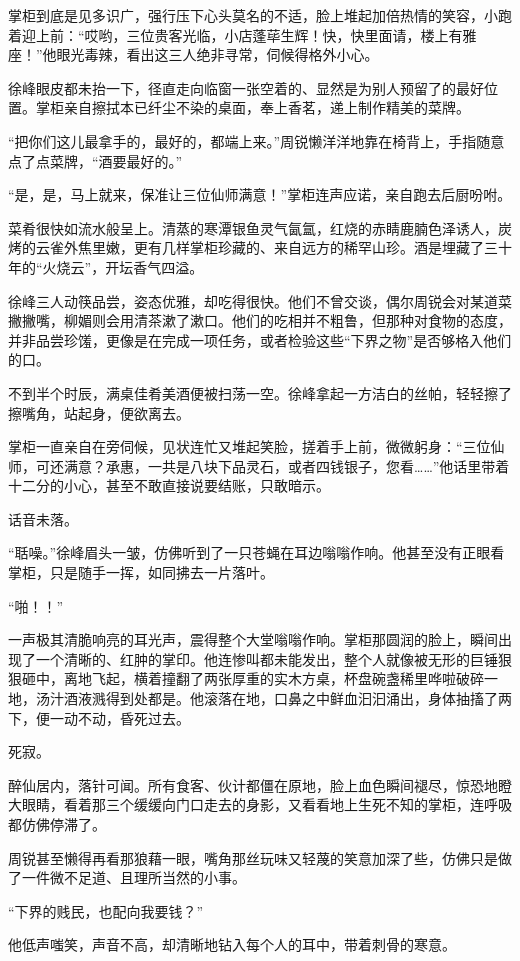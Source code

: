 掌柜到底是见多识广，强行压下心头莫名的不适，脸上堆起加倍热情的笑容，小跑着迎上前：“哎哟，三位贵客光临，小店蓬荜生辉！快，快里面请，楼上有雅座！”他眼光毒辣，看出这三人绝非寻常，伺候得格外小心。

徐峰眼皮都未抬一下，径直走向临窗一张空着的、显然是为别人预留了的最好位置。掌柜亲自擦拭本已纤尘不染的桌面，奉上香茗，递上制作精美的菜牌。

“把你们这儿最拿手的，最好的，都端上来。”周锐懒洋洋地靠在椅背上，手指随意点了点菜牌，“酒要最好的。”

“是，是，马上就来，保准让三位仙师满意！”掌柜连声应诺，亲自跑去后厨吩咐。

菜肴很快如流水般呈上。清蒸的寒潭银鱼灵气氤氲，红烧的赤睛鹿腩色泽诱人，炭烤的云雀外焦里嫩，更有几样掌柜珍藏的、来自远方的稀罕山珍。酒是埋藏了三十年的“火烧云”，开坛香气四溢。

徐峰三人动筷品尝，姿态优雅，却吃得很快。他们不曾交谈，偶尔周锐会对某道菜撇撇嘴，柳媚则会用清茶漱了漱口。他们的吃相并不粗鲁，但那种对食物的态度，并非品尝珍馐，更像是在完成一项任务，或者检验这些“下界之物”是否够格入他们的口。

不到半个时辰，满桌佳肴美酒便被扫荡一空。徐峰拿起一方洁白的丝帕，轻轻擦了擦嘴角，站起身，便欲离去。

掌柜一直亲自在旁伺候，见状连忙又堆起笑脸，搓着手上前，微微躬身：“三位仙师，可还满意？承惠，一共是八块下品灵石，或者四钱银子，您看……”他话里带着十二分的小心，甚至不敢直接说要结账，只敢暗示。

话音未落。

“聒噪。”徐峰眉头一皱，仿佛听到了一只苍蝇在耳边嗡嗡作响。他甚至没有正眼看掌柜，只是随手一挥，如同拂去一片落叶。

“啪！！”

一声极其清脆响亮的耳光声，震得整个大堂嗡嗡作响。掌柜那圆润的脸上，瞬间出现了一个清晰的、红肿的掌印。他连惨叫都未能发出，整个人就像被无形的巨锤狠狠砸中，离地飞起，横着撞翻了两张厚重的实木方桌，杯盘碗盏稀里哗啦破碎一地，汤汁酒液溅得到处都是。他滚落在地，口鼻之中鲜血汩汩涌出，身体抽搐了两下，便一动不动，昏死过去。

死寂。

醉仙居内，落针可闻。所有食客、伙计都僵在原地，脸上血色瞬间褪尽，惊恐地瞪大眼睛，看着那三个缓缓向门口走去的身影，又看看地上生死不知的掌柜，连呼吸都仿佛停滞了。

周锐甚至懒得再看那狼藉一眼，嘴角那丝玩味又轻蔑的笑意加深了些，仿佛只是做了一件微不足道、且理所当然的小事。

“下界的贱民，也配向我要钱？”

他低声嗤笑，声音不高，却清晰地钻入每个人的耳中，带着刺骨的寒意。

